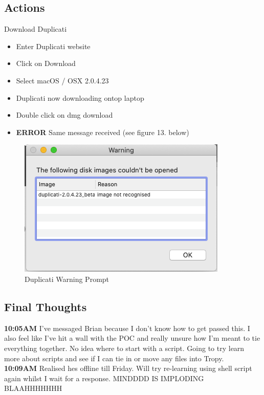 \documentclass{article}
\begin{document}
\subsection{Actions}
Download Duplicati
\begin{itemize}
\item Enter Duplicati website
\item Click on Download
\item Select macOS / OSX 2.0.4.23
\item Duplicati now downloading ontop laptop
\item Double click on dmg download
\item \textbf{ERROR} Same message received (see figure 13. below)
\end{itemize}

\begin{figure}[H]
    \centering
    \includegraphics[width=\textwidth]{Images/Duplicati_warning.png}
    \caption{Duplicati Warning Prompt}
    \label{fig:my_label}
\end{figure}

\subsection{Final Thoughts}
\textbf{10:05AM} I've messaged Brian because I don't know how to get passed this. I also feel like I've hit a wall with the POC and really unsure how I'm meant to tie everything together. No idea where to start with a script. Going to try learn more about scripts and see if I can tie in or move any files into Tropy. \\
\textbf{10:09AM} Realised hes offline till Friday. Will try re-learning using shell script again whilst I wait for a response. MINDDDD IS IMPLODING BLAAHHHHHHH
\end{document}
